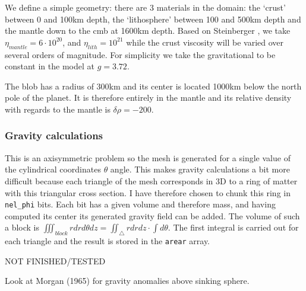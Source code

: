 We define a simple geometry: there are 3 materials in the domain: the `crust' between 0 and 100km depth, 
the `lithosphere' between 100 and 500km depth and the mantle down to the cmb at 1600km depth.
Based on Steinberger \etal \cite{stwt10}, we take $\eta_{mantle}=6\cdot 10^{20}$, and $\eta_{lith}=10^{21}$
while the crust viscosity will be varied over several orders of magnitude.
For simplicity we take the gravitational to be constant in the model at $g=3.72$.

The blob has a radius of 300km and its center is located 1000km below the north pole of the planet.
It is therefore entirely in the mantle and its relative density with regards to the mantle is $\delta\rho=-200$.

 
\subsubsection*{Gravity calculations}

This is an axisymmetric problem so the mesh is generated for a single value of the cylindrical 
coordinates $\theta$ angle. 
This makes gravity calculations a bit more difficult because each triangle of the mesh corresponds
in 3D to a ring of matter with this triangular cross section. 
I have therefore chosen to chunk this ring in {\tt nel\_phi} bits. Each bit has a given volume and therefore
mass, and having computed its center its generated gravity field can be added. 
The volume of such a block is $\iiint_{block} r dr d\theta dz =\iint_\triangle rdrdz \cdot \int d\theta$.  
The first integral is carried out for each triangle and the result is stored in the {\tt arear} array. 

NOT FINISHED/TESTED

Look at Morgan (1965) \cite{morg65} for gravity anomalies above sinking sphere. 




